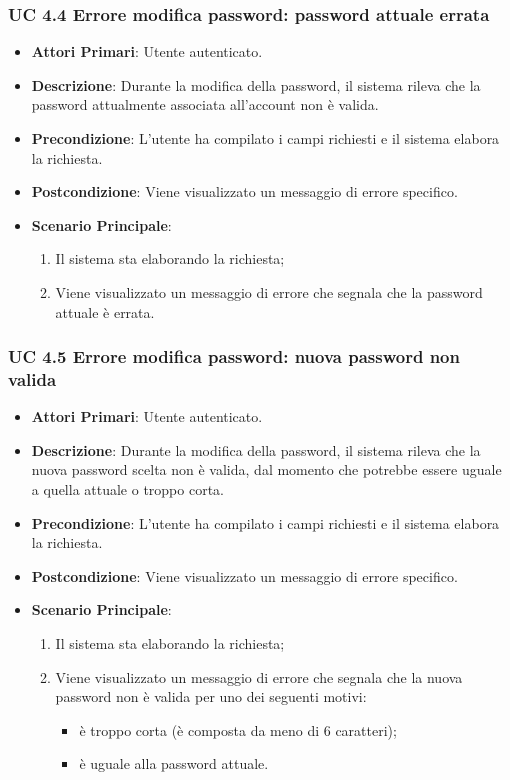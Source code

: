 			\subsubsection{UC 4.4 Errore modifica password: password attuale errata}
			\begin{itemize}
				\item \textbf{Attori Primari}: Utente autenticato.
				\item \textbf{Descrizione}: Durante la modifica della password, il sistema rileva che la password attualmente associata all'account non è valida.
				\item \textbf{Precondizione}: L'utente ha compilato i campi richiesti e il sistema elabora la richiesta.
				\item \textbf{Postcondizione}: Viene visualizzato un messaggio di errore specifico.
				\item \textbf{Scenario Principale}:
				\begin{enumerate}
					\item Il sistema sta elaborando la richiesta;
					\item Viene visualizzato un messaggio di errore che segnala che la password attuale è errata.
				\end{enumerate}
			\end{itemize}

			\subsubsection{UC 4.5 Errore modifica password: nuova password non valida}
			\begin{itemize}
				\item \textbf{Attori Primari}: Utente autenticato.
				\item \textbf{Descrizione}: Durante la modifica della password, il sistema rileva che la nuova password scelta non è valida, dal momento che potrebbe essere uguale a quella attuale o troppo corta.
				\item \textbf{Precondizione}: L'utente ha compilato i campi richiesti e il sistema elabora la richiesta.
				\item \textbf{Postcondizione}: Viene visualizzato un messaggio di errore specifico.
				\item \textbf{Scenario Principale}:
				\begin{enumerate}
					\item Il sistema sta elaborando la richiesta;
					\item Viene visualizzato un messaggio di errore che segnala che la nuova password non è valida per uno dei seguenti motivi:
					\begin{itemize}
						\item è troppo corta (è composta da meno di 6 caratteri);
						\item è uguale alla password attuale.
					\end{itemize}
				\end{enumerate}
			\end{itemize}


